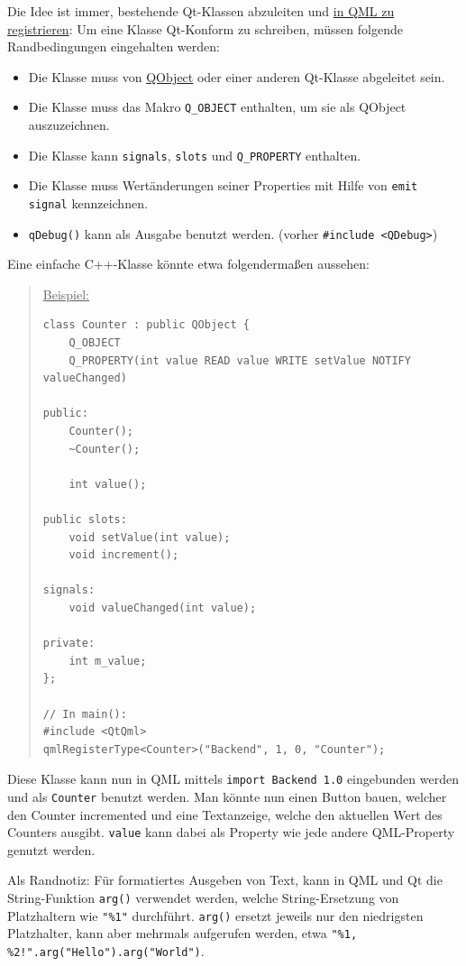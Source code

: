 \documentclass[a4paper]{article}
\begin{document}
Die Idee ist immer, bestehende Qt-Klassen abzuleiten und \href{http://qt-project.org/doc/qt-5/properties.html}{in QML zu registrieren}:
Um eine Klasse Qt-Konform zu schreiben, müssen folgende Randbedingungen eingehalten werden:
\begin{itemize}
\item Die Klasse muss von \href{http://qt-project.org/doc/qt-5/qobject.html}{QObject} oder einer anderen Qt-Klasse abgeleitet sein.
\item Die Klasse muss das Makro \verb~Q_OBJECT~ enthalten, um sie als QObject auszuzeichnen.
\item Die Klasse kann \verb~signals~, \verb~slots~ und \verb~Q_PROPERTY~ enthalten.
\item Die Klasse muss Wertänderungen seiner Properties mit Hilfe von \verb~emit signal~ kennzeichnen.
\item \verb~qDebug()~ kann als Ausgabe benutzt werden. (vorher \verb~#include <QDebug>~)
\end{itemize}

Eine einfache C++-Klasse könnte etwa folgendermaßen aussehen:

\begin{quote}
\uline{Beispiel:}

\begin{verbatim}
class Counter : public QObject {
    Q_OBJECT
    Q_PROPERTY(int value READ value WRITE setValue NOTIFY valueChanged)

public:
    Counter();
    ~Counter();

    int value();

public slots:
    void setValue(int value);
    void increment();

signals:
    void valueChanged(int value);

private:
    int m_value;
};

// In main():
#include <QtQml>
qmlRegisterType<Counter>("Backend", 1, 0, "Counter");
\end{verbatim}
\end{quote}

Diese Klasse kann nun in QML mittels \verb~import Backend 1.0~ eingebunden werden und als \verb~Counter~ benutzt werden. Man könnte nun einen Button bauen, welcher den Counter incremented und eine Textanzeige, welche den aktuellen Wert des Counters ausgibt. \verb~value~ kann dabei als Property wie jede andere QML-Property genutzt werden.

Als Randnotiz: Für formatiertes Ausgeben von Text, kann in QML und Qt die String-Funktion \verb~arg()~ verwendet werden, welche String-Ersetzung von Platzhaltern wie \verb~"%1"~ durchführt. \verb~arg()~ ersetzt jeweils nur den niedrigsten Platzhalter, kann aber mehrmals aufgerufen werden, etwa \verb~"%1, %2!".arg("Hello").arg("World")~.
\end{document}

